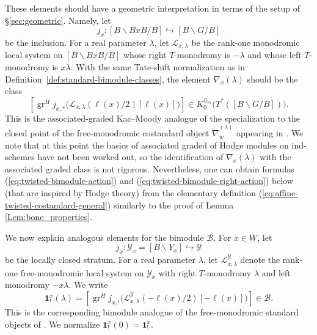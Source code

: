 \documentclass{amsart}
\newcommand{\bone}{\mathbf{1}}
\newcommand{\gr}{\operatorname{gr}}
\theoremstyle{definition}
\newtheorem{defi}[Thm]{Definition}
\numberwithin{equation}{section}
\begin{document}



These elements {should} have a geometric interpretation in terms of the setup of \S\ref{sec:geometric}. Namely, let
\[
j_x:[B\backslash BxB/B]\hookrightarrow [B\backslash G/B]
\]
be the inclusion. For a real parameter \(\lambda\),
let \(\mathcal L_{x,\lambda}\) be the rank-one monodromic local
system on \([B\backslash BxB/B]\) whose right \(T\)-monodromy is \(-\lambda\)
and whose left \(T\)-monodromy is \(x\lambda\). With the same Tate-shift normalization as in
Definition~\ref{def:standard-bimodule-classes}, the element \(\nabla_x(\lambda)\) should be the
class
\[
\left[
\gr^H j_{x,*}\bigl(\mathcal L_{x,\lambda}(\ell(x)/2)[\ell(x)]\bigr)
\right]
\in K_0^{\mathbb G_m}\bigl(T^*([B\backslash G/B])\bigr).
\]
This is the associated-graded Kac--Moody analogue of { the
specialization to the closed point of the free-monodromic costandard object} \(\tilde{\nabla}_w^{(\lambda)}\) appearing in
\cite[Notation~3.1]{DMB}. We note that at this point the basics of associated graded of Hodge modules on ind-schemes have not been worked out, so the identification of \(\nabla_x(\lambda)\) with the associated graded class is not rigorous. Nevertheless, one can obtain formulas (\ref{eq:twisted-bimodule-action})
and (\ref{eq:twisted-bimodule-right-action}) below (that are inspired by Hodge theory) from the elementary definition (\ref{eq:affine-twisted-costandard-general}) similarly to the proof of Lemma \ref{Lem:bone_properties}.

We now explain analogous elements for the bimodule
\(\mathcal B\). For \(x\in W\), let
\[
j_x:\mathcal Y_x=[B\backslash Y_x]\hookrightarrow \mathcal Y
\]
be the locally closed stratum. For a real parameter \(\lambda\), let
\(\mathcal L^{\mathcal Y}_{x,\lambda}\) denote the rank-one free-monodromic local system on
\(\mathcal Y_x\) with right \(T\)-monodromy \(\lambda\) and
left monodromy \(-x\lambda\). We write
\[
\bone_!^x(\lambda)=
\left[
\gr^H j_{x,!}\bigl(\mathcal L^{\mathcal Y}_{x,\lambda}(-\ell(x)/2)[-\ell(x)]\bigr)
\right]
\in \mathcal B .
\]
This is the corresponding bimodule analogue of the free-monodromic standard
objects of \cite[Notation~3.1]{DMB}.
We normalize \(\bone_!^x(0)=\bone_!^x\).
\end{document}
